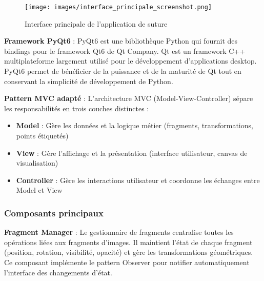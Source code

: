 \documentclass[12pt,a4paper]{report}
\begin{document}
\begin{}
\begin{}
\begin{}
\begin{}
\begin{figure}[H]
\centering
\texttt{[image: images/interface\_principale\_screenshot.png]}
\caption{Interface principale de l'application de suture}
\label{fig:interface_principale}
\end{figure}

\textbf{Framework PyQt6} : PyQt6 est une bibliothèque Python qui fournit des bindings pour le framework Qt6 de Qt Company. Qt est un framework C++ multiplateforme largement utilisé pour le développement d'applications desktop. PyQt6 permet de bénéficier de la puissance et de la maturité de Qt tout en conservant la simplicité de développement de Python.

\textbf{Pattern MVC adapté} : L'architecture MVC (Model-View-Controller) sépare les responsabilités en trois couches distinctes :
\begin{itemize}
\item \textbf{Model} : Gère les données et la logique métier (fragments, transformations, points étiquetés)
\item \textbf{View} : Gère l'affichage et la présentation (interface utilisateur, canvas de visualisation)
\item \textbf{Controller} : Gère les interactions utilisateur et coordonne les échanges entre Model et View
\end{itemize}

\subsubsection{Composants principaux}

\textbf{Fragment Manager} : Le gestionnaire de fragments centralise toutes les opérations liées aux fragments d'images. Il maintient l'état de chaque fragment (position, rotation, visibilité, opacité) et gère les transformations géométriques. Ce composant implémente le pattern Observer pour notifier automatiquement l'interface des changements d'état.

\begin{figure}[H]
\centering
{}
\end{figure}
\end{}
\end{}
\end{}
\end{}
\end{document}
